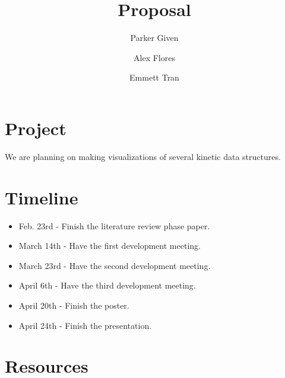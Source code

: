 \documentclass[secnumarabic,amssymb, nobibnotes, aps, pra]{revtex4}
\begin{document}
\title{Proposal}
\author{Parker Given}
\author{Alex Flores}
\affiliation{}
\author{Emmett Tran}
\affiliation{}

\maketitle

\section{Project}
We are planning on making visualizations of several kinetic data structures.
\section{Timeline}
\begin{itemize}%
\item Feb. 23rd - Finish the literature review phase paper.
\item March 14th - Have the first development meeting.
\item March 23rd - Have the second development meeting.
\item April 6th - Have the third development meeting.
\item April 20th - Finish the poster.
\item April 24th - Finish the presentation. %
\end{itemize}

\section{Resources}



{}

\end{document}
